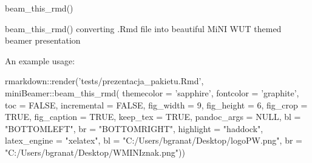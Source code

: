 \documentclass[ignorenonframetext,]{beamer}
\newenvironment{Shaded}{}{}
\newcommand{\DataTypeTok}[1]{#1}
\newcommand{\DecValTok}[1]{#1}
\newcommand{\KeywordTok}[1]{\textcolor[rgb]{0.00,0.00,1.00}{#1}}
\newcommand{\NormalTok}[1]{#1}
\newcommand{\OperatorTok}[1]{#1}
\newcommand{\OtherTok}[1]{\textcolor[rgb]{1.00,0.25,0.00}{#1}}
\newcommand{\StringTok}[1]{\textcolor[rgb]{0.00,0.50,0.50}{#1}}
\begin{document}
\begin{frame}[fragile]{beam\_this\_rmd()}
\protect\hypertarget{beam_this_rmd-1}{}

beam\_this\_rmd() converting .Rmd file into beautiful MiNI WUT themed
beamer presentation

An example usage:

\scriptsize

\begin{Shaded}
\begin{Highlighting}[]
\NormalTok{rmarkdown}\OperatorTok{::}\KeywordTok{render}\NormalTok{(}\StringTok{'tests/prezentacja_pakietu.Rmd'}\NormalTok{, }
\NormalTok{    miniBeamer}\OperatorTok{::}\KeywordTok{beam_this_rmd}\NormalTok{(}
      \DataTypeTok{themecolor =} \StringTok{'sapphire'}\NormalTok{,}
      \DataTypeTok{fontcolor =} \StringTok{'graphite'}\NormalTok{,}
      \DataTypeTok{toc =} \OtherTok{FALSE}\NormalTok{,}
      \DataTypeTok{incremental =} \OtherTok{FALSE}\NormalTok{,}
      \DataTypeTok{fig_width =} \DecValTok{9}\NormalTok{,}
      \DataTypeTok{fig_height =} \DecValTok{6}\NormalTok{,}
      \DataTypeTok{fig_crop =} \OtherTok{TRUE}\NormalTok{,}
      \DataTypeTok{fig_caption =} \OtherTok{TRUE}\NormalTok{,}
      \DataTypeTok{keep_tex =} \OtherTok{TRUE}\NormalTok{,}
      \DataTypeTok{pandoc_args =} \OtherTok{NULL}\NormalTok{,}
      \DataTypeTok{bl =} \StringTok{"BOTTOMLEFT"}\NormalTok{,}
      \DataTypeTok{br =} \StringTok{"BOTTOMRIGHT"}\NormalTok{,}
      \DataTypeTok{highlight =} \StringTok{"haddock"}\NormalTok{,}
      \DataTypeTok{latex_engine =} \StringTok{"xelatex"}\NormalTok{,}
      \DataTypeTok{bl =} \StringTok{"C:/Users/bgranat/Desktop/logoPW.png"}\NormalTok{,}
      \DataTypeTok{br =} \StringTok{"C:/Users/bgranat/Desktop/WMINIznak.png"}\NormalTok{))}
\end{Highlighting}
\end{Shaded}

\end{frame}
\end{document}
